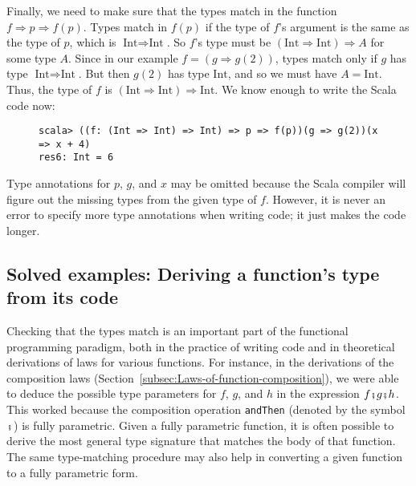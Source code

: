 Finally, we need to make sure that the types match in the function
$f\Rightarrow p\Rightarrow f(p)$. Types match in $f(p)$ if the type
of $f$'s argument is the same as the type of $p$, which is $\text{Int}\Rightarrow\text{Int}$.
So $f$'s type must be $\left(\text{Int}\Rightarrow\text{Int}\right)\Rightarrow A$
for some type $A$. Since in our example $f=\left(g\Rightarrow g(2)\right)$,
types match only if $g$ has type $\text{Int}\Rightarrow\text{Int}$.
But then $g(2)$ has type $\text{Int}$, and so we must have $A=\text{Int}$.
Thus, the type of $f$ is $\left(\text{Int}\Rightarrow\text{Int}\right)\Rightarrow\text{Int}$.
We know enough to write the Scala code now:

\begin{wrapfigure}{l}{0.69\columnwidth}%
\vspace{-0.75\baselineskip}
\begin{lstlisting}
scala> ((f: (Int => Int) => Int) => p => f(p))(g => g(2))(x => x + 4)
res6: Int = 6
\end{lstlisting}
\vspace{-1\baselineskip}
\end{wrapfigure}%

\noindent Type annotations for $p$, $g$, and $x$ may be omitted
because the Scala compiler will figure out the missing types from
the given type of $f$. However, it is never an error to specify more
type annotations when writing code; it just makes the code longer.

\subsection{Solved examples: Deriving a function's type from its code}

Checking that the types match is an important part of the functional
programming paradigm, both in the practice of writing code and in
theoretical derivations of laws for various functions. For instance,
in the derivations of the composition laws (Section~\ref{subsec:Laws-of-function-composition}),
we were able to deduce the possible type parameters for $f$, $g$,
and $h$ in the expression $f\bef g\bef h$. This worked because the
composition operation \lstinline!andThen! (denoted by the symbol
$\bef$) is fully parametric. Given a fully parametric function, it
is often possible to derive the most general type signature that matches
the body of that function. The same type-matching procedure may also
help in converting a given function to a fully parametric form.

